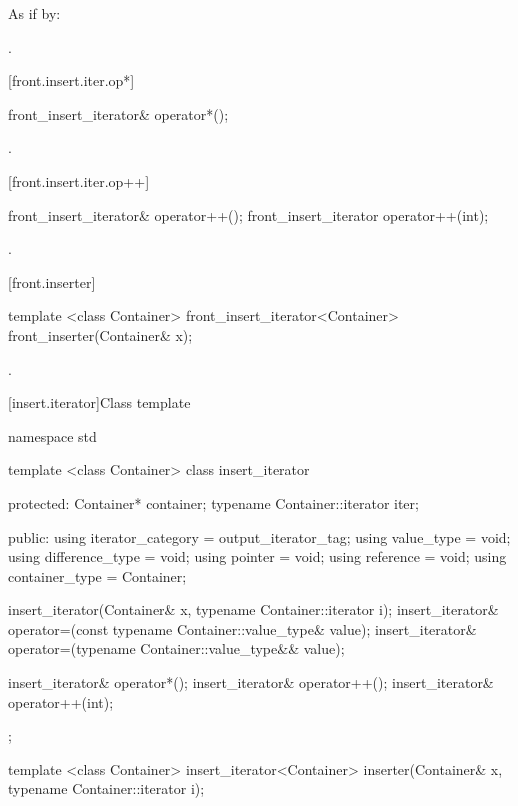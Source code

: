 \begin{itemdescr}
\pnum
\effects
As if by: 

\pnum
\returns
{}.
\end{itemdescr}

[front.insert.iter.op*]{}

%
\begin{itemdecl}
front_insert_iterator& operator*();
\end{itemdecl}

\begin{itemdescr}
\pnum
\returns
{}.
\end{itemdescr}

[front.insert.iter.op++]{}

%
\begin{itemdecl}
front_insert_iterator& operator++();
front_insert_iterator  operator++(int);
\end{itemdecl}

\begin{itemdescr}
\pnum
\returns
{}.
\end{itemdescr}

[front.inserter]{}

%
\begin{itemdecl}
template <class Container>
  front_insert_iterator<Container> front_inserter(Container& x);
\end{itemdecl}

\begin{itemdescr}
\pnum
\returns
{}.
\end{itemdescr}

[insert.iterator]{Class template }

%
\begin{codeblock}
namespace std {
  template <class Container>
  class insert_iterator {
  protected:
    Container* container;
    typename Container::iterator iter;

  public:
    using iterator_category = output_iterator_tag;
    using value_type        = void;
    using difference_type   = void;
    using pointer           = void;
    using reference         = void;
    using container_type    = Container;

    insert_iterator(Container& x, typename Container::iterator i);
    insert_iterator& operator=(const typename Container::value_type& value);
    insert_iterator& operator=(typename Container::value_type&& value);

    insert_iterator& operator*();
    insert_iterator& operator++();
    insert_iterator& operator++(int);
  };

  template <class Container>
    insert_iterator<Container> inserter(Container& x, typename Container::iterator i);
}
\end{codeblock}

